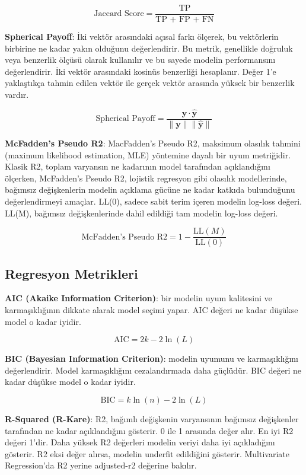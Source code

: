 \[\text{Jaccard Score} = \frac{\text{TP}}{\text{TP + FP + FN}}\]

\textbf{Spherical Payoff}: İki vektör arasındaki açısal farkı ölçerek, bu vektörlerin birbirine ne kadar yakın olduğunu değerlendirir. Bu metrik, genellikle doğruluk veya benzerlik ölçüsü olarak kullanılır ve bu sayede modelin performansını değerlendirir. İki vektör arasındaki kosinüs benzerliği hesaplanır. Değer 1'e yaklaştıkça tahmin edilen vektör ile gerçek vektör arasında yüksek bir benzerlik vardır.

\[ \text{Spherical Payoff} = \frac{\mathbf{y} \cdot \mathbf{\hat{y}}}{\|\mathbf{y}\| \|\mathbf{\hat{y}}\|} \]

\textbf{McFadden's Pseudo R2}: MacFadden's Pseudo R2, maksimum olasılık tahmini (maximum likelihood estimation, MLE) yöntemine dayalı bir uyum metriğidir. Klasik R2, toplam varyansın ne kadarının model tarafından açıklandığını ölçerken, McFadden's Pseudo R2, lojistik regresyon gibi olasılık modellerinde, bağımsız değişkenlerin modelin açıklama gücüne ne kadar katkıda bulunduğunu değerlendirmeyi amaçlar. LL(0), sadece sabit terim içeren modelin log-loss değeri. LL(M), bağımsız değişkenlerinde dahil edildiği tam modelin log-loss değeri.

\[ \text{McFadden's Pseudo R2} = 1 - \frac{\text{LL}(M)}{\text{LL}(0)} \]

\subsection{Regresyon Metrikleri}

\textbf{AIC (Akaike Information Criterion)}: bir modelin uyum kalitesini ve karmaşıklığının dikkate alarak model seçimi yapar. AIC değeri ne kadar düşükse model o kadar iyidir.

\[ \text{AIC} = 2k - 2\ln(L) \]

\textbf{BIC (Bayesian Information Criterion)}: modelin uyumunu ve karmaşıklığını değerlendirir. Model karmaşıklığını cezalandırmada daha güçlüdür. BIC değeri ne kadar düşükse model o kadar iyidir.

\[ \text{BIC} = k \ln(n) - 2\ln(L) \]

\textbf{R-Squared (R-Kare)}: R2, bağımlı değişkenin varyansının bağımsız değişkenler tarafından ne kadar açıklandığını gösterir. 0 ile 1 arasında değer alır. En iyi R2 değeri 1'dir. Daha yüksek R2 değerleri modelin veriyi daha iyi açıkladığını gösterir. R2 eksi değer alırsa, modelin underfit edildiğini gösterir. Multivariate Regression'da R2 yerine adjusted-r2 değerine bakılır.

